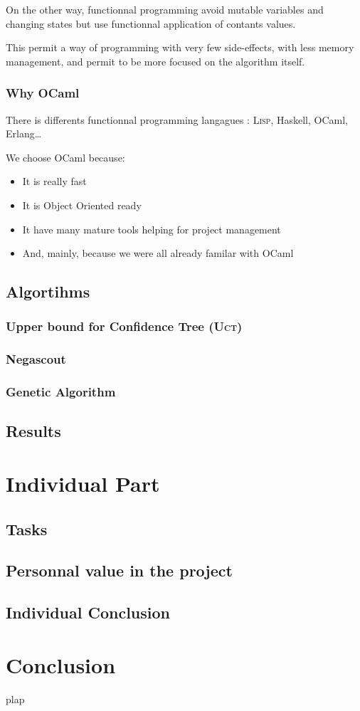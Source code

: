On the other way, functionnal programming avoid mutable variables and changing states but use functionnal application of contants values.

This permit a way of programming with very few side-effects, with less memory management, and permit to be more focused on the algorithm itself.

\subsection{Why OCaml}

There is differents functionnal programming langagues : \textsc{Lisp}, Haskell, OCaml, Erlang\ldots

We choose OCaml because:
\begin{itemize}
\item It is really fast
\item It is Object Oriented ready
\item It have many mature tools helping for project management
\item And, mainly, because we were all already familar with OCaml
\end{itemize}


\section{Algortihms}

\subsection{Upper bound for Confidence Tree (\textsc{Uct})}

\subsection{Negascout}



\subsection{Genetic Algorithm}

\section{Results}

\chapter{Individual Part}

\section{Tasks}

\section{Personnal value in the project}

\section{Individual Conclusion}

\chapter*{Conclusion}
plap

